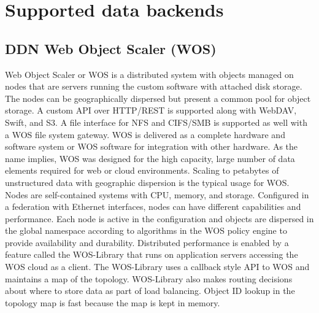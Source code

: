 \section{Supported data backends}
\subsection{DDN Web Object Scaler (WOS)}

Web Object Scaler or WOS is a distributed system with objects managed on nodes that are servers running the custom software with attached disk storage. 
The nodes can be geographically dispersed but present a common pool for object storage. 
A custom API over HTTP/REST is supported along with WebDAV, Swift, and S3. 
A file interface for NFS and CIFS/SMB is supported as well with a WOS file system gateway. 
WOS is delivered as a complete hardware and software system or WOS software for integration with other hardware.
As the name implies, WOS was designed for the high capacity, large number of data elements required for web or cloud environments. 
Scaling to petabytes of unstructured data with geographic dispersion is the typical usage for WOS. 
Nodes are self-contained systems with CPU, memory, and storage. 
Configured in a federation with Ethernet interfaces, nodes can have different capabilities and performance. 
Each node is active in the configuration and objects are dispersed in the global namespace according to algorithms in the WOS policy engine to provide availability and durability.
Distributed performance is enabled by a feature called the WOS-Library that runs on application servers accessing the WOS cloud as a client. 
The WOS-Library uses a callback style API to WOS and maintains a map of the topology. 
WOS-Library also makes routing decisions about where to store data as part of load balancing. 
Object ID lookup in the topology map is fast because the map is kept in memory.


